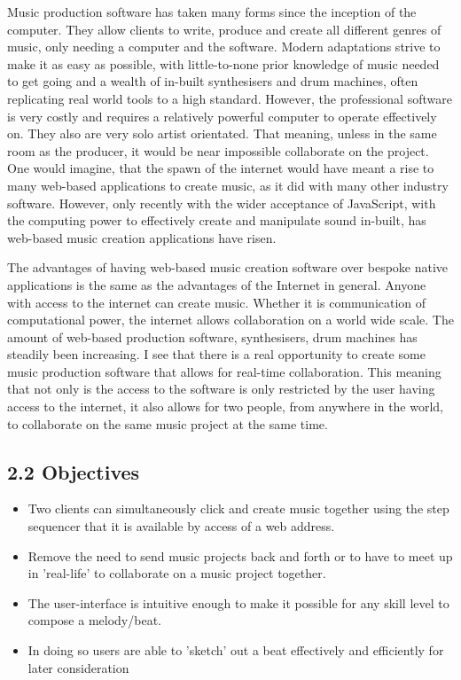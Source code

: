 \documentclass[a4paper]{article}
\begin{document}
Music production software has taken many forms since the inception of the computer. They allow clients to write, produce and create all different genres of music, only needing a computer and the software. Modern adaptations strive to make it as easy as possible, with little-to-none prior knowledge of music needed to get going and a wealth of in-built synthesisers and drum machines, often replicating real world tools to a high standard. However, the professional software is very costly and requires a relatively powerful computer to operate effectively on. They also are very solo artist orientated. That meaning, unless in the same room as the producer, it would be near impossible collaborate on the project. One would imagine, that the spawn of the internet would have meant a rise to many web-based applications to create music, as it did with many other industry software. However, only recently with the wider acceptance of JavaScript, with the computing power to effectively create and manipulate sound in-built, has web-based music creation applications have risen. \par

The advantages of having web-based music creation software over bespoke native applications is the same as the advantages of the Internet in general. Anyone with access to the internet can create music. Whether it is communication of computational power, the internet allows collaboration on a world wide scale. The amount of web-based production software, synthesisers, drum machines has steadily been increasing. I see that there is a real opportunity to create some music production software that allows for real-time collaboration. This meaning that not only is the access to the software is only restricted by the user having access to the internet, it also allows for two people, from anywhere in the world, to collaborate on the same music project at the same time.

\subsection{2.2 Objectives}

\begin{itemize}
    \item[$\alph$] Two clients can simultaneously click and create music together using the step sequencer that it is available by access of a web address.
    \item[$\alph$] Remove the need to send music projects back and forth or to have to meet up in 'real-life' to collaborate on a music project together.
    \item[$\alph$] The user-interface is intuitive enough to make it possible for any skill level to compose a melody/beat.
    \item[$\alph$] In doing so users are able to 'sketch' out a beat effectively and efficiently for later consideration

\end{itemize}
\end{document}
